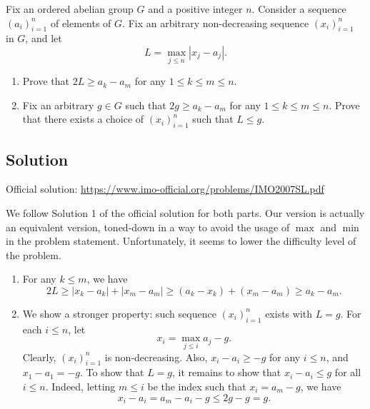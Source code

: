 Fix an ordered abelian group $G$ and a positive integer $n$.
Consider a sequence $(a_i)_{i = 1}^n$ of elements of $G$.
Fix an arbitrary non-decreasing sequence $(x_i)_{i = 1}^n$ in $G$, and let
\[ L = \max_{j \leq n} |x_j - a_j|. \]

\begin{enumerate}
    \item   Prove that $2L \geq a_k - a_m$ for any $1 \leq k \leq m \leq n$.
    \item   Fix an arbitrary $g \in G$ such that $2g \geq a_k - a_m$ for any $1 \leq k \leq m \leq n$.
            Prove that there exists a choice of $(x_i)_{i = 1}^n$ such that $L \leq g$.
\end{enumerate}



\subsection*{Solution}

Official solution: \url{https://www.imo-official.org/problems/IMO2007SL.pdf}

We follow Solution 1 of the official solution for both parts.
Our version is actually an equivalent version, toned-down in a way to avoid the usage of $\max$ and $\min$ in the problem statement.
Unfortunately, it seems to lower the difficulty level of the problem.

\begin{enumerate}

    \item
    For any $k \leq m$, we have
    \[ 2L \geq |x_k - a_k| + |x_m - a_m| \geq (a_k - x_k) + (x_m - a_m) \geq a_k - a_m. \]

    \item
    We show a stronger property: such sequence $(x_i)_{i = 1}^n$ exists with $L = g$.
    For each $i \leq n$, let
    \[ x_i = \max_{j \leq i} a_j - g. \]
    Clearly, $(x_i)_{i = 1}^n$ is non-decreasing.
    Also, $x_i - a_i \geq -g$ for any $i \leq n$, and $x_1 - a_1 = -g$.
    To show that $L = g$, it remains to show that $x_i - a_i \leq g$ for all $i \leq n$.
    Indeed, letting $m \leq i$ be the index such that $x_i = a_m - g$, we have
    \[ x_i - a_i = a_m - a_i - g \leq 2g - g = g. \]

\end{enumerate}
